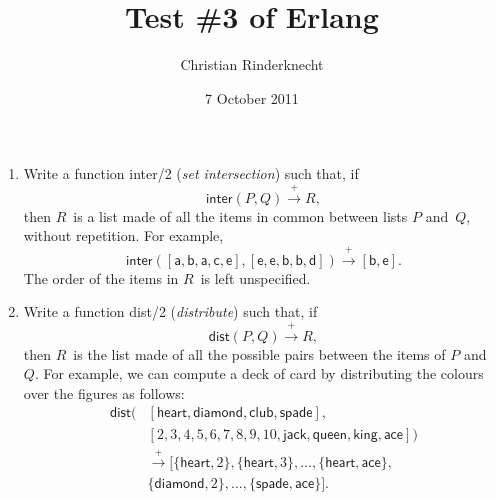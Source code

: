 \documentclass[11pt,a4paper]{article}
\title{Test \#3 of \textsf{Erlang}}
\author{Christian Rinderknecht}
\date{7 October 2011}
\newcommand\fun[1]{\textsf{#1}}
\begin{document}
\maketitle

\thispagestyle{empty}

\begin{enumerate}

  \item Write a function \fun{inter/2} (\emph{set intersection}) such
    that, if \[\fun{inter}(P,Q) \xrightarrow{+} R,\] then \(R\)~is a
    list made of all the items in common between lists \(P\)
    and~\(Q\), without repetition. For example,
    \[\fun{inter}([\fun{a},\fun{b},\fun{a},\fun{c},\fun{e}],
                  [\fun{e},\fun{e},\fun{b},\fun{b},\fun{d}])
                  \xrightarrow{+} [\fun{b},\fun{e}].\] The order of
                  the items in \(R\)~is left unspecified.

  \item Write a function \fun{dist/2} (\emph{distribute}) such that,
    if \[\fun{dist}(P,Q) \xrightarrow{+} R,\] then \(R\)~is the list
    made of all the possible pairs between the items of \(P\)
    and~\(Q\). For example, we can compute a deck of card by
    distributing the colours over the figures as follows:
    \begin{align*}
      \fun{dist}(&[\fun{heart}, \fun{diamond}, \fun{club},
        \fun{spade}],\\
                 &[2, 3, 4, 5, 6, 7, 8, 9, 10, \fun{jack},
                    \fun{queen}, \fun{king},\fun{ace}])\\
      &\xrightarrow{+}
    [\{\fun{heart}, 2\}, \{\fun{heart}, 3\}, \ldots, \{\fun{heart},
      \fun{ace}\},\\
     & \{\fun{diamond}, 2\}, \ldots, \{\fun{spade}, \fun{ace}\}].
    \end{align*}

\end{enumerate}
\end{document}

